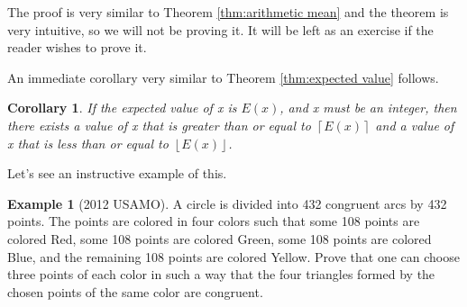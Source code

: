 \documentclass[l1pt]{article}
\theoremstyle{plain}
\newtheorem{corollary}[thm]{Corollary}
\theoremstyle{definition}
\newtheorem{example}[thm]{Example}
\theoremstyle{remark}
\begin{document}
The proof is very similar to Theorem \ref{thm:arithmetic mean} and the theorem is very intuitive, so we will not be proving it. It will be left as an exercise if the reader wishes to prove it. 

An immediate corollary very similar to Theorem \ref{thm:expected value} follows.

\begin{mdframed}
    \begin{corollary}
    \label{Corollary:Expected Value}
    If the expected value of x is $E(x)$, and x must be an integer, then there exists a value of x that is greater than or equal to $\left \lceil{E(x)}\right \rceil$ and a value of x that is less than or equal to $\left \lfloor{E(x)}\right \rfloor $.
    \end{corollary}
\end{mdframed}

Let's see an instructive example of this.

\begin{example}[2012 USAMO]
A circle is divided into 432 congruent arcs by 432 points. The points are colored in four colors such that some 108 points are colored Red, some 108 points are colored Green, some 108 points are colored Blue, and the remaining 108 points are colored Yellow. Prove that one can choose three points of each color in such a way that the four triangles formed by the chosen points of the same color are congruent.
\end{example} 
\end{document}
